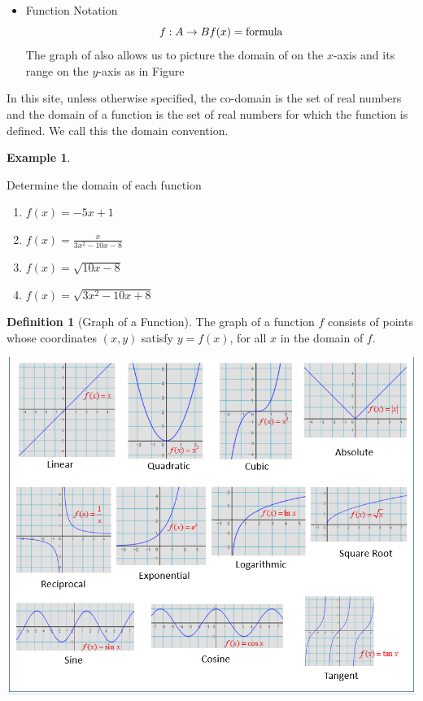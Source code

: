 \documentclass[
]{book}
\providecommand{\tightlist}{%
  \setlength{\itemsep}{0pt}\setlength{\parskip}{0pt}}
\theoremstyle{definition}
\newtheorem{definition}{Definition}[chapter]
\theoremstyle{definition}
\newtheorem{example}{Example}[chapter]
\theoremstyle{definition}
\theoremstyle{definition}
\theoremstyle{remark}
\begin{document}
\begin{itemize}
\tightlist
\item
  Function Notation
  \[
  f : A \rightarrow B\\
  f(x) = \text{formula}
  \]
  The graph of also allows us to picture the domain of on the \(x\)-axis and its range on the \(y\)-axis as in Figure
\end{itemize}

In this site, unless otherwise specified, the co-domain is the set of real numbers and the domain of a function is the set of real numbers for which the function is defined. We call this the domain convention.

\begin{example}
\protect\hypertarget{exm:unnamed-chunk-2}{}\label{exm:unnamed-chunk-2}

Determine the domain of each function

\begin{enumerate}
\def\labelenumi{\roman{enumi}.}
\tightlist
\item
  \(f(x) = -5x + 1\)
\item
  \(f(x) = \frac{x}{3x^2 - 10x - 8}\)
\item
  \(f(x) = \sqrt{10x - 8}\)
\item
  \(f(x) = \sqrt{3x^2 - 10x + 8}\)
\end{enumerate}

\end{example}

\begin{definition}[Graph of a Function]
\protect\hypertarget{def:unnamed-chunk-3}{}\label{def:unnamed-chunk-3}The graph of a function \(f\) consists of points whose coordinates \((x, y)\) satisfy \(y = f(x)\), for all \(x\) in the domain of \(f\).
\end{definition}

\includegraphics{fig/fig5.png}
\end{document}
